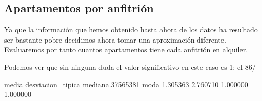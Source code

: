 \documentclass [a4paper] {article}
\begin{document}
\newpage
\subsection{Apartamentos por anfitrión}
Ya que la información que hemos obtenido hasta ahora de los datos ha resultado ser bastante pobre decidimos ahora tomar una aproximación diferente.
Evaluaremos por tanto cuantos apartamentos tiene cada anfitrión en alquiler.

Podemos ver que sin ninguna duda el valor significativo en este caso es 1; el 86/%
\begin{Schunk}
\end{Schunk}
\begin{Schunk}
\begin{Soutput}
            media desviacion_tipica  mediana.37565381              moda 
         1.305363          2.760710          1.000000          1.000000 
\end{Soutput}
\end{Schunk}
\end{document}
